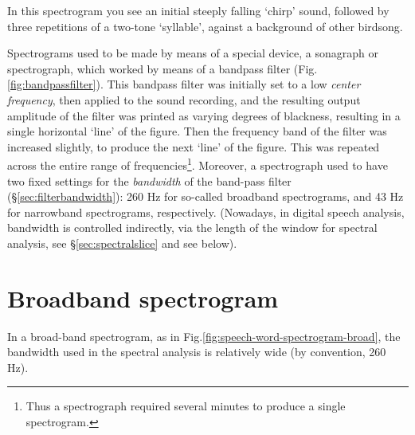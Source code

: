 \documentclass[
]{book}
\begin{document}
In this spectrogram you see an initial steeply falling `chirp' sound, followed by three repetitions of a two-tone `syllable', against a background of other birdsong.

Spectrograms used to be made by means of a special device, a sonagraph or spectrograph, which worked by means of a bandpass filter (Fig.\ref{fig:bandpassfilter}). This bandpass filter was initially set to a low \emph{center frequency}, then applied to the sound recording, and the resulting output amplitude of the filter was printed as varying degrees of blackness, resulting in a single horizontal `line' of the figure. Then the frequency band of the filter was increased slightly, to produce the next `line' of the figure. This was repeated across the entire range of frequencies\footnote{Thus a spectrograph required several minutes to produce a single spectrogram.}. Moreover, a spectrograph used to have two fixed settings for the \emph{bandwidth} of the band-pass filter (§\ref{sec:filterbandwidth}): 260 Hz for so-called broadband spectrograms, and 43 Hz for narrowband spectrograms, respectively. (Nowadays, in digital speech analysis, bandwidth is controlled indirectly, via the length of the window for spectral analysis, see §\ref{sec:spectralslice} and see below).

\section{Broadband spectrogram}\label{broadband-spectrogram}

In a broad-band spectrogram, as in Fig.\ref{fig:speech-word-spectrogram-broad}, the bandwidth used in the spectral analysis is relatively wide (by convention, 260 Hz).
\end{document}
